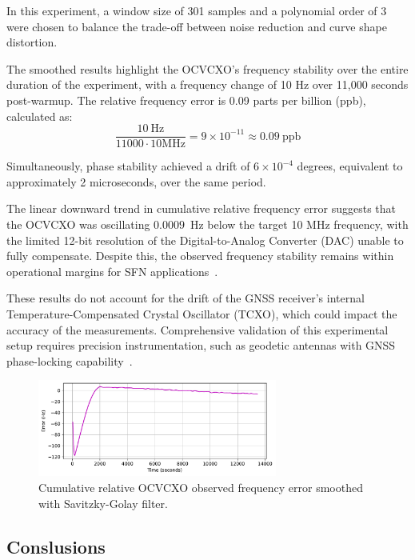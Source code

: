 \documentclass[12pt, a4paper]{extarticle}
\begin{document}
In this experiment, a window size of 301 samples and a polynomial order of 3
were chosen to balance the trade-off between noise reduction and curve shape
distortion.


The smoothed results highlight the OCVCXO's frequency stability over the entire
duration of the experiment, with a frequency change of 10 Hz over 11,000
seconds post-warmup. The relative frequency error is 0.09 parts per billion
(ppb), calculated as:
\[
    \frac{10\ \text{Hz}}{11000 \cdot 10 \text{MHz}} = 9 \times 10^{-11} \approx 0.09\ \text{ppb}
\]

Simultaneously, phase stability achieved a drift of $6 \times 10^{-4}$ degrees, equivalent
to approximately 2 microseconds, over the same period.

The linear downward trend in cumulative relative frequency error suggests that
the OCVCXO was oscillating $0.0009$~Hz below the target 10 MHz frequency, with
the limited 12-bit resolution of the Digital-to-Analog Converter (DAC) unable
to fully compensate. Despite this, the observed frequency stability remains
within operational margins for SFN applications~\cite{1dvbt2, 2dvbt2, 3dvbt2, 4dvbt2, morshed2009synchronization}.


These results do not account for the drift of the GNSS receiver's internal
Temperature-Compensated Crystal Oscillator (TCXO), which could impact the
accuracy of the measurements. Comprehensive validation of this experimental
setup requires precision instrumentation, such as geodetic antennas with GNSS
phase-locking capability~\cite{geodesic,gps-time-transfer}.

\begin{figure}[H]
    \centering
    \includegraphics[width=0.7\textwidth]{cumsum-err-smooth.pdf}
    \captionsetup{width=0.8\textwidth}
    \caption{Cumulative relative OCVCXO observed frequency error smoothed with Savitzky-Golay filter.}
    \label{fig:cumsum-err-smooth}
\end{figure}

\subsection{Conslusions}
\end{document}
